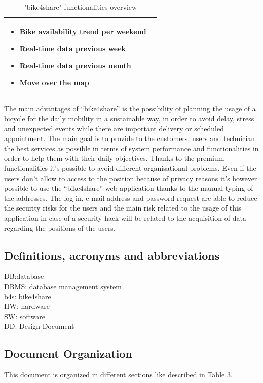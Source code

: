 \documentclass{article}
\begin{document}
\begin{table} [H]
\begin{center}
\begin{tabular}{|l|p{}|}
\begin{itemize}
                               \item Bike availability trend per weekend
                               \item Real-time data previous week
                               \item Real-time data previous month
                               \item Move over the map
                               \end{itemize}
                \\
            \hline
        \end{tabular}
    \end{center}
\caption{"bike4share" functionalities overview}
\end{table}
The main advantages of “bike4share” is the possibility of planning the usage of a bicycle for the daily mobility in a sustainable way, in order to avoid delay, stress and unexpected events while there are important delivery or scheduled appointment.
The main goal is to provide to the customers, users and technician the best services as possible in terms of system performance and functionalities in order to help them with their daily objectives.
Thanks to the premium functionalities it’s possible to avoid different organisational problems. 
Even if the users don’t allow to access to the position because of privacy reasons it’s however possible to use the “bike4share” web application thanks to the manual typing of the addresses.  
The log-in, e-mail address and password request are able to reduce the security risks for the users and the main risk related to the usage of this application in case of a security hack will be related to the acquisition of data regarding the positions of the users.
\subsection{Definitions, acronyms and abbreviations}
DB:database\\
DBMS: database management system\\
b4s: bike4share\\
HW: hardware\\
SW: software\\
DD: Design Document
\subsection{Document Organization}
This document is organized in different sections like described in Table 3.
\end{document}
